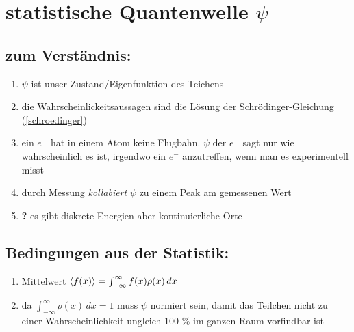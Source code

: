 \section{statistische Quantenwelle $\psi$}

\subsection{zum Verständnis:}
\begin{enumerate}
    \item $\psi$ ist unser Zustand/Eigenfunktion des Teichens
    \item die Wahrscheinlickeitsaussagen sind die Lösung der Schrödinger-Gleichung (\ref{schroedinger})

    \item ein $e^-$ hat in einem Atom keine Flugbahn. $\psi$ der $e^-$ sagt nur wie wahrscheinlich es ist,
    irgendwo ein $e^-$  anzutreffen, wenn man es experimentell misst
    \item durch Messung \textit{kollabiert} $\psi$ zu einem Peak am gemessenen Wert 
    \item \textbf{?} es gibt diskrete Energien aber kontinuierliche Orte 
\end{enumerate}

\subsection{Bedingungen aus der Statistik:}
\begin{enumerate}
    \item Mittelwert $\braket{f(x)}=\int_{-\infty}^{\infty} f(x)\rho(x) \,dx$
    \item da $\int_{-\infty}^{\infty} \rho(x) \,dx=1$ muss $\psi$ normiert sein, damit 
    das Teilchen nicht zu einer Wahrscheinlichkeit ungleich 100 $\%$ im ganzen Raum vorfindbar ist
\end{enumerate}

